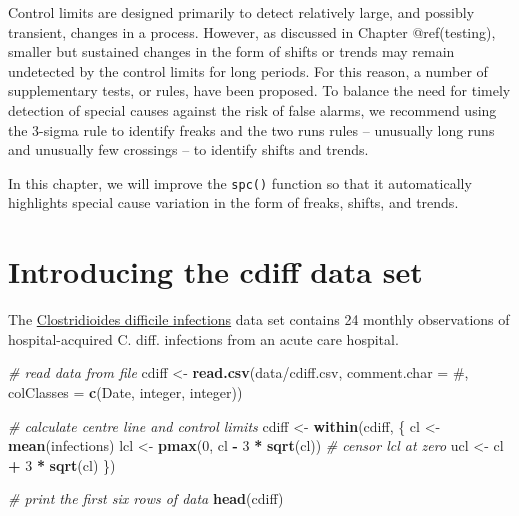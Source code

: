 \documentclass[
]{book}
\newenvironment{Shaded}{\begin{snugshade}}{\end{snugshade}}
\newcommand{\AttributeTok}[1]{\textcolor[rgb]{0.13,0.29,0.53}{#1}}
\newcommand{\CommentTok}[1]{\textcolor[rgb]{0.56,0.35,0.01}{\textit{#1}}}
\newcommand{\DecValTok}[1]{\textcolor[rgb]{0.00,0.00,0.81}{#1}}
\newcommand{\FunctionTok}[1]{\textcolor[rgb]{0.13,0.29,0.53}{\textbf{#1}}}
\newcommand{\NormalTok}[1]{#1}
\newcommand{\OtherTok}[1]{\textcolor[rgb]{0.56,0.35,0.01}{#1}}
\newcommand{\SpecialCharTok}[1]{\textcolor[rgb]{0.81,0.36,0.00}{\textbf{#1}}}
\newcommand{\StringTok}[1]{\textcolor[rgb]{0.31,0.60,0.02}{#1}}
\begin{document}
Control limits are designed primarily to detect relatively large, and
possibly transient, changes in a process. However, as discussed in
Chapter @ref(testing), smaller but sustained changes in the form of
shifts or trends may remain undetected by the control limits for long
periods. For this reason, a number of supplementary tests, or rules,
have been proposed. To balance the need for timely detection of special
causes against the risk of false alarms, we recommend using the 3-sigma
rule to identify freaks and the two runs rules -- unusually long runs
and unusually few crossings -- to identify shifts and trends.

In this chapter, we will improve the \texttt{spc()} function so that it
automatically highlights special cause variation in the form of freaks,
shifts, and trends.

\section{Introducing the cdiff data
set}\label{introducing-the-cdiff-data-set}

The \hyperref[clostridioides-difficile-infections]{Clostridioides
difficile infections} data set contains 24 monthly observations of
hospital-acquired C. diff. infections from an acute care hospital.

\begin{Shaded}
\begin{Highlighting}[]
\CommentTok{\# read data from file}
\NormalTok{cdiff }\OtherTok{\textless{}{-}} \FunctionTok{read.csv}\NormalTok{(}\StringTok{\textquotesingle{}data/cdiff.csv\textquotesingle{}}\NormalTok{,}
                  \AttributeTok{comment.char =} \StringTok{\textquotesingle{}\#\textquotesingle{}}\NormalTok{,}
                  \AttributeTok{colClasses =} \FunctionTok{c}\NormalTok{(}\StringTok{\textquotesingle{}Date\textquotesingle{}}\NormalTok{,}
                                 \StringTok{\textquotesingle{}integer\textquotesingle{}}\NormalTok{,}
                                 \StringTok{\textquotesingle{}integer\textquotesingle{}}\NormalTok{))}

\CommentTok{\# calculate centre line and control limits}
\NormalTok{cdiff }\OtherTok{\textless{}{-}} \FunctionTok{within}\NormalTok{(cdiff, \{}
\NormalTok{  cl  }\OtherTok{\textless{}{-}} \FunctionTok{mean}\NormalTok{(infections)}
\NormalTok{  lcl }\OtherTok{\textless{}{-}} \FunctionTok{pmax}\NormalTok{(}\DecValTok{0}\NormalTok{, cl }\SpecialCharTok{{-}} \DecValTok{3} \SpecialCharTok{*} \FunctionTok{sqrt}\NormalTok{(cl)) }\CommentTok{\# censor lcl at zero}
\NormalTok{  ucl }\OtherTok{\textless{}{-}}\NormalTok{ cl }\SpecialCharTok{+} \DecValTok{3} \SpecialCharTok{*} \FunctionTok{sqrt}\NormalTok{(cl)}
\NormalTok{\})}

\CommentTok{\# print the first six rows of data}
\FunctionTok{head}\NormalTok{(cdiff)}
\end{Highlighting}
\end{Shaded}
\end{document}
